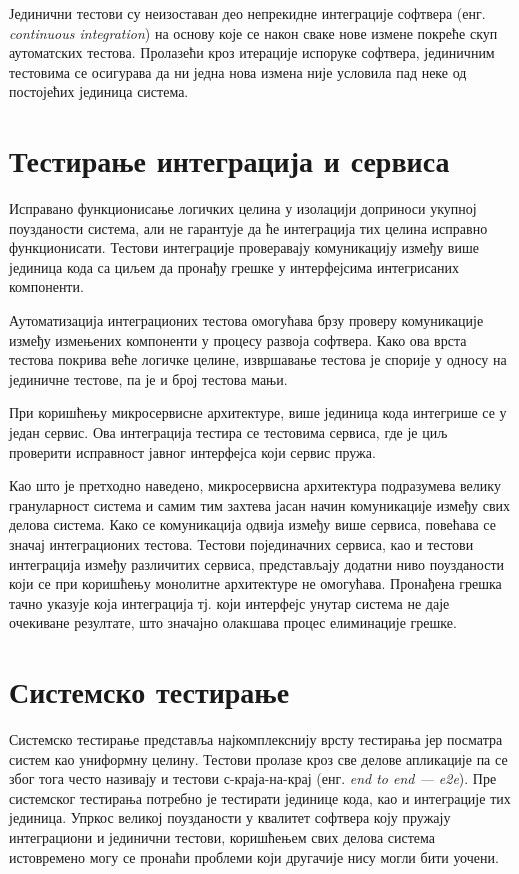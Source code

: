 \documentclass[12pt,oneside]{memoir}
\begin{document}
Јединични тестови су неизоставан део непрекидне интеграције софтвера (енг. \textit{continuous integration}) на основу које се након сваке нове измене покреће скуп аутоматских тестова. Пролазећи кроз итерације испоруке софтвера, јединичним тестовима се осигурава да ни једна нова измена није условила пад неке од постојећих јединица система.

\section{Тестирање интеграција и сервиса}

Исправано функционисање логичких целина у изолацији доприноси укупној поузданости система, али не гарантује да ће интеграција тих целина исправно функционисати. Тестови интеграције проверавају комуникацију између више јединица кода са циљем да пронађу грешке у интерфејсима интегрисаних компоненти.

Аутоматизација интеграционих тестова омогућава брзу проверу комуникације између измењених компоненти у процесу развоја софтвера. Како ова врста тестова покрива веће логичке целине, извршавање тестова је спорије у односу на јединичне тестове, па је и број тестова мањи. 

При коришћењу микросервисне архитектуре, више јединица кода интегрише се у један сервис. Ова интеграција тестира се тестовима сервиса, где је циљ проверити исправност јавног интерфејса који сервис пружа. 

Као што је претходно наведено, микросервисна архитектура подразумева велику грануларност система и самим тим захтева јасан начин комуникације између свих делова система. Како се комуникација одвија између више сервиса, повећава се значај интеграционих тестова. Тестови појединачних сервиса, као и тестови интеграција између различитих сервиса, представљају додатни ниво поузданости који се при коришћењу монолитне архитектуре не омогућава. Пронађена грешка тачно указује која интеграција тј. који интерфејс унутар система не даје очекиване резултате, што значајно олакшава процес елиминације грешке.


\section{Системско тестирање}

Системско тестирање представља најкомплекснију врсту тестирања јер посматра систем као униформну целину. Тестови пролазе кроз све делове апликације па се због тога често називају и тестови с-краја-на-крај (енг.\textit{ end to end --- e2e}). Пре системског тестирања потребно је тестирати јединице кода, као и интеграције тих јединица. Упркос великој поузданости у квалитет софтвера коју пружају интеграциони и јединични тестови, коришћењем свих делова система истовремено могу се пронаћи проблеми који другачије нису могли бити уочени.
\end{document}
